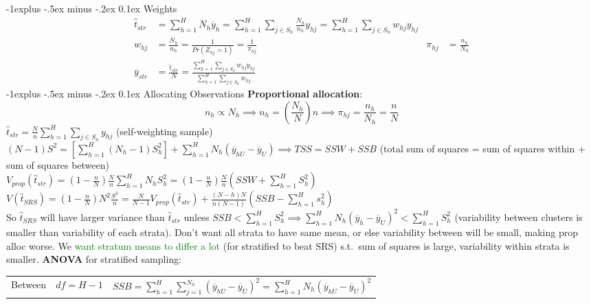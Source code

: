 \documentclass[landscape]{article}
\makeatletter
\renewcommand{\subsection}{\@startsection{subsection}{2}{0mm}%
                                {-1explus -.5ex minus -.2ex}%
                                {0.1ex}%
                                {\color{orange}\normalfont\normalsize\bfseries}}
\makeatother
\begin{document}
\begin{multicols*}{3}
\subsection{Weights}
\begin{align*}
\hat{t}_{str}& = \sum_{h=1}^{H} N_h \overline{y}_h = \sum_{h=1}^{H}
\sum_{j \in S_h} \frac{N_h}{n_h}y_{hj} = \sum_{h=1}^{H} \sum_{j\in
  S_h} w_{hj} y_{hj}
\\w_{hj} &= \frac{N_h}{n_h} = \frac{1}{Pr(Z_{hj} = 1)}
= \frac{1}{\pi_{hj}}
& \pi_{hj} & = \frac{n_h}{N_h}
\\\overline{y}_{str} & = \frac{\hat{t}_{str}}{N} = \frac{\sum_{h=1}^H
  \sum_{j \in S_h}w_{hj}y_{hj}}{\sum_{h=1}^{H}\sum_{j \in S_h}
  w_{hj}}
\end{align*}
\subsection{Allocating Observations}
\textbf{Proportional allocation}: $$n_h \propto N_h \implies n_h =
\left(\frac{N_h}{N}\right)n \implies \pi_{hj} = \frac{n_h}{N_h} =
\frac{n}{N}$$
$\hat{t}_{str} = \frac{N}{n} \sum_{h=1}^{H} \sum_{j \in S_h}
y_{hj}$ (self-weighting sample)
\\ $(N-1) S^2 = \left[\sum_{h=1}^{H} (N_h - 1)S_h^2\right] +
\sum_{h=1}^{H} N_h (\overline{y}_{hU} - \overline{y}_U) \implies TSS =
SSW + SSB$ (total sum of squares = sum of squares within + sum of
squares between)
\\ $V_{prop}(\hat{t}_{str}) = \left(1 - \frac{n}{N}\right) \frac{N}{n}
\sum_{h=1}^{H} N_h S_h^2 = \left(1 - \frac{n}{N}\right) \frac{N}{n}
(SSW + \sum_{h=1}^{H} S_h^2)$
\\ $V(\hat{t}_{SRS}) = \left(1 - \frac{n}{N}\right)N^2 \frac{S^2}{n} =
\frac{N}{N-1}V_{prop}(\hat{t}_{str}) + \frac{(N-h)N}{n(N-1)} (SSB -
\sum_{h=1}^{H} s_h^2)$
\\ So $\hat{t}_{SRS}$ will have larger variance than $\hat{t}_{str}$
unless $SSB < \sum_{h=1}^{H} S_h^2 \implies \sum_{h=1}^{H} N_h
(\overline{y}_h - \overline{y}_U)^2 < \sum_{h=1}^{H} S_h^2$
(variability between clusters is smaller than variability of each
strata). Don't want all strata to have same mean, or else variability
between will be small, making prop alloc worse. We \textcolor{green}{want stratum means
to differ a lot} (for stratified to beat SRS) s.t.\ sum of squares is large, variability within
strata is smaller.
\textbf{ANOVA} for stratified sampling:\\
\begin{tabular}{c | c c}
  Between& $df = H - 1$& $SSB = \sum_{h=1}^H \sum_{j = 1}^{N_h} \left(\overline{y}_{hU} - \overline{y}_U\right)^2 = \sum_{h=1}^{H}N_h (\overline{y}_{hU} - \overline{y}_U)^2$

\end{tabular}
\end{multicols*}
\end{document}
